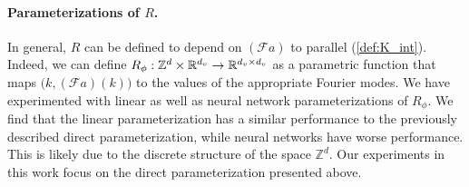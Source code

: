 \documentclass{article} %
\newcommand{\cG}{\mathcal{F}}
\begin{document}




\paragraph{Parameterizations of $R$.} 
In general, $R$ can be defined to depend on $(\cG a)$ to parallel (\ref{def:K_int}).
Indeed, we can define $R_\phi: \mathbb{Z}^d \times \mathbb{R}^{d_v} \to \mathbb{R}^{d_v \times d_v}$
as a parametric function that maps \(\bigl(k,(\cG a)(k))\) to the values of the appropriate Fourier modes. We have experimented with linear as well as neural network parameterizations of $R_\phi$.
We find that the linear parameterization has a similar performance to the previously described direct parameterization,
while neural networks have worse performance. This is likely due to the discrete structure of the space $\mathbb{Z}^d$.  
Our experiments in this work focus on the direct parameterization presented above.
\end{document}
